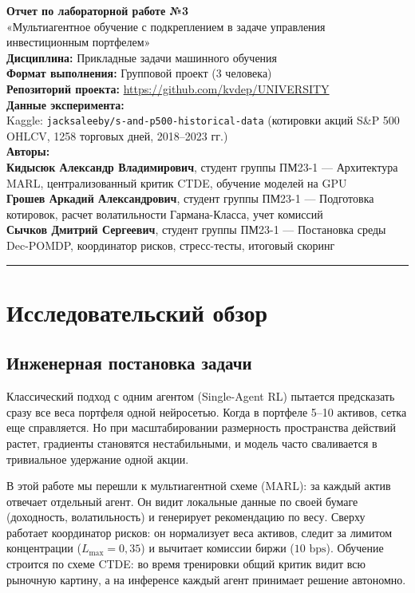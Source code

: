 \documentclass[11pt,a4paper]{article}
\begin{document}
\begin{center}
{\Large\bfseries Отчет по лабораторной работе №3}\\[6pt]
{\large «Мультиагентное обучение с подкреплением в задаче управления инвестиционным портфелем»}\\[8pt]
\textbf{Дисциплина:} Прикладные задачи машинного обучения\\[2pt]
\textbf{Формат выполнения:} Групповой проект (3 человека)\\[2pt]
\textbf{Репозиторий проекта:} \url{https://github.com/kvdep/UNIVERSITY}\\[4pt]
\textbf{Данные эксперимента:}\\
Kaggle: \texttt{jacksaleeby/s-and-p500-historical-data} (котировки акций S\&P 500 OHLCV, 1258 торговых дней, 2018--2023 гг.)\\[6pt]
\textbf{Авторы:}\\
\textbf{Кидысюк Александр Владимирович}, студент группы ПМ23-1 --- Архитектура MARL, централизованный критик CTDE, обучение моделей на GPU\\
\textbf{Грошев Аркадий Александрович}, студент группы ПМ23-1 --- Подготовка котировок, расчет волатильности Гармана-Класса, учет комиссий\\
\textbf{Сычков Дмитрий Сергеевич}, студент группы ПМ23-1 --- Постановка среды Dec-POMDP, координатор рисков, стресс-тесты, итоговый скоринг
\end{center}

\vspace{0.8em}
\hrule
\vspace{0.8em}

\section{Исследовательский обзор}

\subsection{Инженерная постановка задачи}

Классический подход с одним агентом (Single-Agent RL) пытается предсказать сразу все веса портфеля одной нейросетью. Когда в портфеле 5--10 активов, сетка еще справляется. Но при масштабировании размерность пространства действий растет, градиенты становятся нестабильными, и модель часто сваливается в тривиальное удержание одной акции.

В этой работе мы перешли к мультиагентной схеме (MARL): за каждый актив отвечает отдельный агент. Он видит локальные данные по своей бумаге (доходность, волатильность) и генерирует рекомендацию по весу. Сверху работает координатор рисков: он нормализует веса активов, следит за лимитом концентрации ($L_{\max} = 0{,}35$) и вычитает комиссии биржи ($10\text{ bps}$). Обучение строится по схеме CTDE: во время тренировки общий критик видит всю рыночную картину, а на инференсе каждый агент принимает решение автономно.
\end{document}
